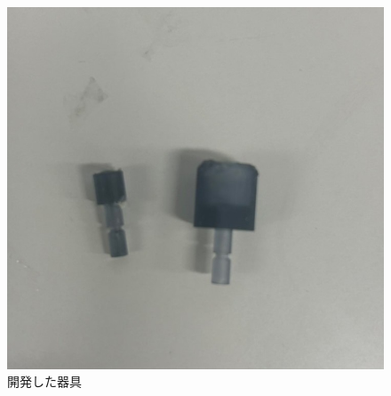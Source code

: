 \begin{figure}[h]
  \centering  %
  \includegraphics[scale=0.3]{pic/S__157270018.jpg}
  \caption{開発した器具}
  \label{fig:kuro}
\end{figure}





